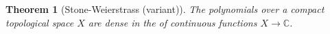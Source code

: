 \documentclass[12pt,oneside]{report}
\newtheorem{thm}{Theorem}[chapter]
\begin{document}
\begin{thm}[Stone-Weierstrass (variant)]
    The polynomials over a compact topological space $X$ are dense in the of continuous functions $X \to \mathbb{C}$.
\end{thm}





\end{document}
